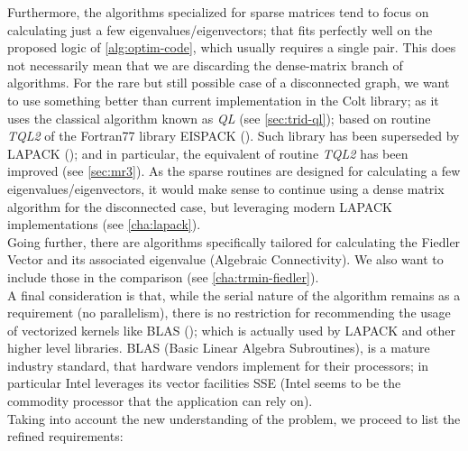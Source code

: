 Furthermore, the algorithms specialized for sparse matrices tend to
focus on calculating just a few eigenvalues/eigenvectors; that fits
perfectly well on the proposed logic of \cref{alg:optim-code}, which
usually requires a single 
pair. This does not necessarily mean that we are discarding
the dense-matrix branch of algorithms. For the rare but still possible
case of a disconnected graph, we want to use something better than
current implementation in the Colt library; as it uses the classical
algorithm known as \emph{QL} (see \cref{sec:trid-ql}); based on routine
\emph{TQL2} of the
 Fortran77 library EISPACK (\cite{eispack}). Such library has been
superseded by LAPACK (\cite{lapack}); and in particular, the
equivalent of routine \emph{TQL2} has been improved (see
\cref{sec:mr3}). As the sparse routines are designed for calculating a
few eigenvalues/eigenvectors, it would make sense to continue using a
dense matrix algorithm for the disconnected case, but leveraging
modern LAPACK implementations (see \cref{cha:lapack}). \\

Going further, there are algorithms specifically tailored for
calculating the Fiedler Vector and its associated eigenvalue
(Algebraic Connectivity). We also want to include those in the
comparison (see \cref{cha:trmin-fiedler}). \\

A final consideration is that, while the serial nature of the
algorithm remains as a requirement (no parallelism), there is no
restriction for recommending the usage of vectorized kernels like BLAS
(\cite{blas}); which is actually used by LAPACK and other higher level
libraries. BLAS (Basic Linear Algebra Subroutines), is a mature
industry standard, that hardware vendors implement for their
processors; in particular Intel leverages its vector facilities SSE
(Intel seems to be the commodity processor that the application can
rely on). \\

Taking into account the new understanding of the problem, we proceed
to list the refined requirements: 

